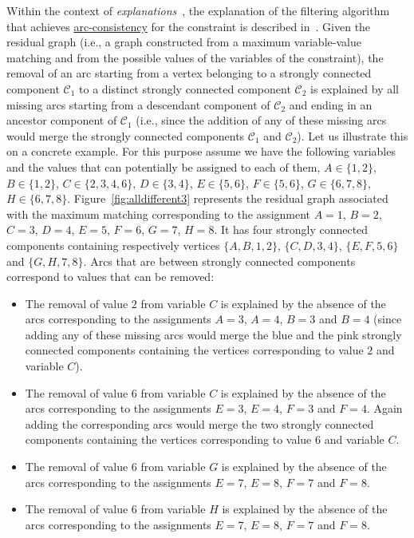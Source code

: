 \begin{ctrdesc}
Within the context of \emph{explanations}~\cite{JussienBarichard00}, the explanation of the filtering algorithm
that achieves \hyperlink{arc-consistency}{arc-consistency} for the  constraint is described
in~\cite[pages 60--61]{Rochart05}.  Given the residual graph (i.e., a graph constructed from a
maximum variable\nobreakdash-value matching and from the possible values of the variables of
the  constraint), the removal of an arc starting from a vertex belonging to a
strongly connected component $\mathcal{C}_1$ to a distinct strongly connected component
$\mathcal{C}_2$ is explained by all missing arcs starting from a descendant component of
$\mathcal{C}_2$ and ending in an ancestor component of $\mathcal{C}_1$ (i.e., since the addition
of any of these missing arcs would merge the strongly connected components $\mathcal{C}_1$ and
$\mathcal{C}_2$).
Let us illustrate this on a concrete example. For this purpose assume we have the following variables
and the values that can potentially be assigned to each of them, $A\in\{1,2\}$, $B\in\{1,2\}$, $C\in\{2,3,4,6\}$,
$D\in\{3,4\}$, $E\in\{5,6\}$, $F\in\{5,6\}$, $G\in\{6,7,8\}$, $H\in\{6,7,8\}$.
Figure~\ref{fig:alldifferent3} represents the residual graph associated with the maximum matching
corresponding to the assignment $A=1$, $B=2$, $C=3$, $D=4$, $E=5$, $F=6$, $G=7$, $H=8$.
It has four strongly connected components containing respectively vertices $\{A,B,1,2\}$,
$\{C,D,3,4\}$, $\{E,F,5,6\}$ and $\{G,H,7,8\}$. Arcs that are between strongly connected components
correspond to values that can be removed:
\begin{itemize}
\item
The removal of value $2$ from variable $C$ is explained by the absence of the arcs corresponding to the assignments
$A=3$, $A=4$, $B=3$ and $B=4$ (since adding any of these missing arcs would merge the blue and the pink strongly
connected components containing the vertices corresponding to value $2$ and variable $C$).
\item
The removal of value $6$ from variable $C$ is explained by the absence of the arcs corresponding to the assignments
$E=3$, $E=4$, $F=3$ and $F=4$. Again adding the corresponding arcs would merge the two strongly connected
components containing the vertices corresponding to value $6$ and variable $C$.
\item
The removal of value $6$ from variable $G$ is explained by the absence of the arcs corresponding to the assignments
$E=7$, $E=8$, $F=7$ and $F=8$.
\item
The removal of value $6$ from variable $H$ is explained by the absence of the arcs corresponding to the assignments
$E=7$, $E=8$, $F=7$ and $F=8$.
\end{itemize}


\end{ctrdesc}
